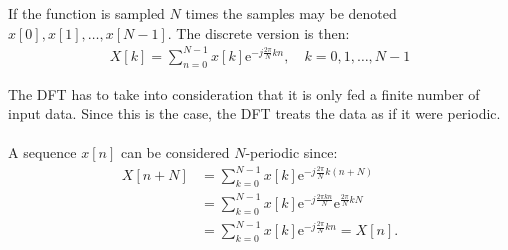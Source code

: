
If the function is sampled $N$ times the samples may be denoted
$x[0],x[1],\dots,x[N-1]$. The discrete version is then:
\begin{align*}
X[k] = \sum_{n=0}^{N-1} x[k]\text{e}^{-j\frac{2\pi}{N}kn}, \quad k = 0, 1, \dots, N-1
\end{align*}

The DFT has to take into consideration that it is only fed a finite number of input data. Since this is the case, the DFT treats the data as if it were periodic.
\\ \\
A sequence $x[n]$ can be considered $N$-periodic since:
\begin{align*}
	X[n+N]
	&= \sum_{k=0}^{N-1} x[k] \text{e}^{-j \frac{2 \pi}{N}  k (n		+N)} \\
	&= \sum_{k=0}^{N-1} x[k] \text{e}^{-j \frac{2 \pi k n}{N}}		\text{e}^{\frac{2 \pi}{N} kN} \\
	&= \sum_{k=0}^{N-1} x[k] \text{e}^{-j \frac{2 \pi}{N} k n} 		= X[n].
\end{align*}

